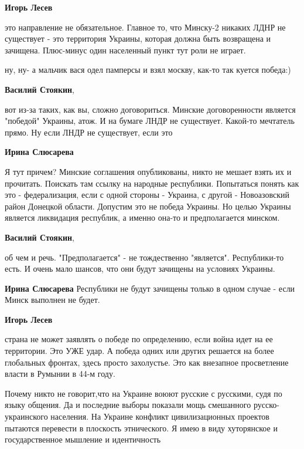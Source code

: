 \begin{itemize}
\begin{itemize}
\textbf{Игорь Лесев} 

это направление не обязательное. Главное то, что Минску-2 никаких ЛДНР не
существует - это территория Украины, которая должна быть возвращена и зачищена.
Плюс-минус один населенный пункт тут роли не играет.


ну, ну- а мальчик вася одел памперсы и взял москву, как-то так куется победа:)

\textbf{Василий Стоякин}, 

вот из-за таких, как вы, сложно договориться. Минские договоренности является
"победой" Украины, атож. И на бумаге ЛНДР не существует. Какой-то мечтатель
прямо. Ну если ЛНДР не существует, если это

\textbf{Ирина Слюсарева} 

Я тут причем? Минские соглашения опубликованы, никто не мешает взять их и
прочитать. Поискать там ссылку на народные республики. Попытаться понять как
это - федерализация, если с одной стороны - Украина, с другой - Новоазовский
район Донецкой области. Допустим это не победа Украины. Но целью Украины
является ликвидация республик, а именно она-то и предполагается минском.

\textbf{Василий Стоякин}, 

об чем и речь. "Предполагается" - не тождественно "является". Республики-то
есть. И очень мало шансов, что они будут зачищены на условиях Украины.

\textbf{Ирина Слюсарева} Республики не будут зачищены только в одном случае - если Минск выполнен не будет.

\textbf{Игорь Лесев} 

страна не может заявлять о победе по определению, если война идет на ее
территории. Это УЖЕ удар. А победа одних или других решается на более
глобальных фронтах, здесь просто захолустье. Это как внезапное просветление
власти в Румынии в 44-м году.

\end{itemize} %


Почему никто не говорит,что на Украине воюют русские с русскими, судя по языку
общения. Да и последние выборы показали мощь смешанного русско-украинского
населения. На Украине конфликт цивилизационных проектов пытаются перевести в
плоскость этнического. Я имею в виду хуторянское и государственное мышление и
идентичность



\end{itemize}
